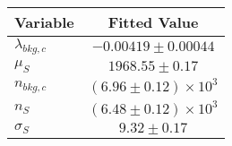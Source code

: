 \begin{tabular}[t]{lc}
\hline
Variable &Fitted Value\\
\hline\hline
$\lambda_{bkg,c}$&$-0.00419\pm0.00044$\\
\hline
$\mu_{S}$&$1968.55\pm0.17$\\
\hline
$n_{bkg,c}$&$(6.96\pm0.12)\times 10^3$\\
\hline
$n_{S}$&$(6.48\pm0.12)\times 10^3$\\
\hline
$\sigma_{S}$&$9.32\pm0.17$\\
\hline
\end{tabular}